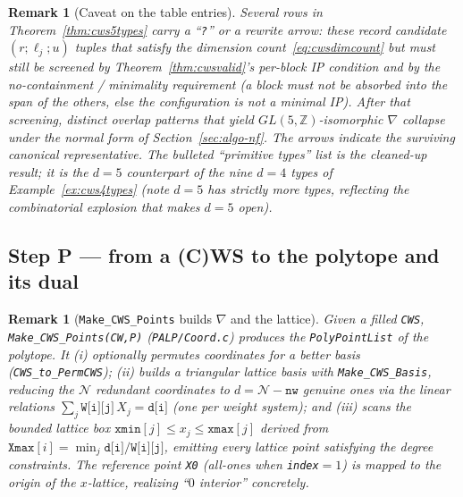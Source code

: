 \documentclass{amsart}
\newtheorem{remark}[theorem]{Remark}
\begin{document}
\begin{remark}[Caveat on the table entries]\label{rmk:cws5caveat}
Several rows in Theorem~\ref{thm:cws5types} carry a ``\texttt{?}'' or a
rewrite arrow: these record candidate $(r;\ell_j;u)$ tuples
that \emph{satisfy the dimension count}~\eqref{eq:cwsdimcount} but must still
be screened by Theorem~\ref{thm:cwsvalid}'s per-block IP condition and by the
no-containment / minimality requirement (a block must not be absorbed into the
span of the others, else the configuration is not a \emph{minimal} IP). After
that screening, distinct overlap patterns that yield $GL(5,\mathbb{Z})$-iso\-mor\-phic
$\nabla$ collapse under the normal form of
Section~\ref{sec:algo-nf}. The arrows indicate the surviving canonical
representative. The bulleted ``primitive types'' list is the cleaned-up
result; it is the $d=5$ counterpart of the nine $d=4$ types of
Example~\ref{ex:cws4types} (note $d=5$ has strictly more types, reflecting the
combinatorial explosion that makes $d=5$ open).
\end{remark}

\subsection{Step P --- from a (C)WS to the polytope and its dual}
\label{sec:algo-poly}

\begin{remark}[\texttt{Make\_CWS\_Points} builds $\nabla$ and the lattice]
\label{rmk:cwspoints}
Given a filled \texttt{CWS}, \texttt{Make\_CWS\_Points(CW,P)}
(\texttt{PALP/Coord.c}) produces the \texttt{PolyPointList} of the polytope.
It (i) optionally permutes coordinates for a better basis
(\texttt{CWS\_to\_PermCWS}); (ii) builds a triangular lattice basis with
\texttt{Make\_CWS\_Basis}, reducing the $\mathcal N$ redundant coordinates to
$d = \mathcal N - \texttt{nw}$ genuine ones via the linear relations
$\sum_j \texttt{W[i][j]}\,X_j = \texttt{d[i]}$ (one per weight system); and
(iii) scans the bounded lattice box
$\texttt{xmin}[j]\le x_j\le \texttt{xmax}[j]$ derived from
$\texttt{Xmax}[i]=\min_j \texttt{d[i]}/\texttt{W[i][j]}$, emitting every
lattice point satisfying the degree constraints. The reference point
\texttt{X0} (all-ones when \texttt{index}$=1$) is mapped to the origin of the
$x$-lattice, realizing ``$0$ interior'' concretely.
\end{remark}
\end{document}
